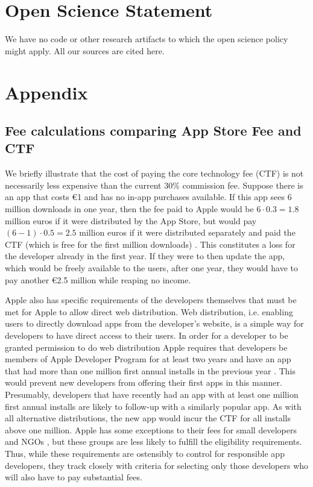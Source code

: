 \documentclass[letterpaper,twocolumn,10pt]{article}
\begin{document}
    \section*{Open Science Statement}
    We have no code or other research artifacts to which the open science policy might apply. All our sources are cited here.
\fi

{\footnotesize 
}
%

\newpage
\section*{Appendix}
\subsection*{Fee calculations comparing App Store Fee and CTF}
We briefly illustrate that the cost of paying the core technology fee (CTF) is not necessarily less expensive than the current 30\% commission fee. Suppose there is an app that costs €1 and has no in-app purchases available.  If this app sees 6 million downloads in one year, then the fee paid to Apple would be $6\cdot0.3=1.8$ million euros if it were distributed by the App Store, but would pay $(6-1)\cdot 0.5 =2.5$ million euros if it were distributed separately and paid the CTF (which is free for the first million downloads) \cite{apple_ctf}.  This constitutes a loss for the developer already in the first year.  If they were to then update the app, which would be freely available to the users, after one year, they would have to pay another €2.5 million while reaping no income. 

Apple also has specific requirements of the developers themselves that must be met for Apple to allow direct web distribution.  Web distribution, i.e. enabling users to directly download apps from the developer's website, is a simple way for developers to have direct access to their users. In order for a developer to be granted permission to do web distribution Apple requires that developers be members of Apple Developer Program for at least two years and have an app that had more than one million first annual installs in the previous year \cite{apple_web_sideloading}.  This would prevent new developers from offering their first apps in this manner.  Presumably, developers that have recently had an app with at least one million first annual installs are likely to follow-up with a similarly popular app.  As with all alternative distributions, the new app would incur the CTF for all installs above one million. Apple has some exceptions to their fees for small developers and NGOs \cite{apple_ctf}, but these groups are less likely to fulfill the eligibility requirements. Thus, while these requirements are ostensibly to control for responsible app developers, they track closely with criteria for selecting only those developers who will also have to pay substantial fees. 
\end{document}
